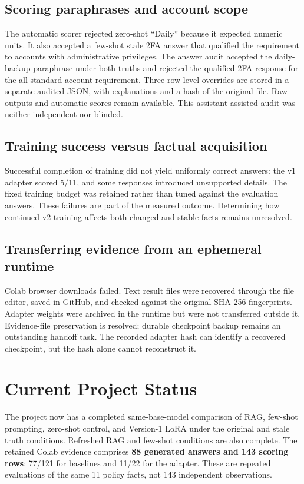 \documentclass[10pt,letterpaper]{article}
\begin{document}
\subsection{Scoring paraphrases and account scope}
The automatic scorer rejected zero-shot ``Daily'' because it expected numeric units. It also accepted a few-shot stale 2FA answer that qualified the requirement to accounts with administrative privileges. The answer audit accepted the daily-backup paraphrase under both truths and rejected the qualified 2FA response for the all-standard-account requirement. Three row-level overrides are stored in a separate audited JSON, with explanations and a hash of the original file. Raw outputs and automatic scores remain available. This assistant-assisted audit was neither independent nor blinded.

\subsection{Training success versus factual acquisition}
Successful completion of training did not yield uniformly correct answers: the v1 adapter scored 5/11, and some responses introduced unsupported details. The fixed training budget was retained rather than tuned against the evaluation answers. These failures are part of the measured outcome. Determining how continued v2 training affects both changed and stable facts remains unresolved.

\subsection{Transferring evidence from an ephemeral runtime}
Colab browser downloads failed. Text result files were recovered through the file editor, saved in GitHub, and checked against the original SHA-256 fingerprints. Adapter weights were archived in the runtime but were not transferred outside it. Evidence-file preservation is resolved; durable checkpoint backup remains an outstanding handoff task. The recorded adapter hash can identify a recovered checkpoint, but the hash alone cannot reconstruct it.

\clearpage
\section{Current Project Status}
The project now has a completed same-base-model comparison of RAG, few-shot prompting, zero-shot control, and Version-1 LoRA under the original and stale truth conditions. Refreshed RAG and few-shot conditions are also complete. The retained Colab evidence comprises \textbf{88 generated answers and 143 scoring rows}: 77/121 for baselines and 11/22 for the adapter. These are repeated evaluations of the same 11 policy facts, not 143 independent observations.
\end{document}

